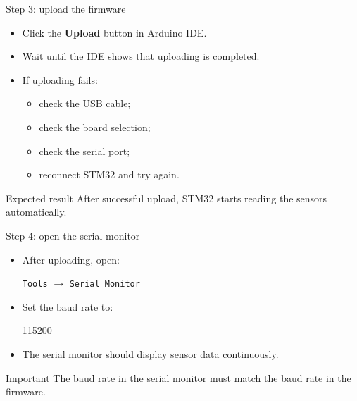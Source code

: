 \documentclass[aspectratio=169]{beamer}
\begin{document}
\begin{frame}{Step 3: upload the firmware}

\begin{itemize}
    \item Click the \textbf{Upload} button in Arduino IDE.
    \vspace{0.35cm}

    \item Wait until the IDE shows that uploading is completed.
    \vspace{0.35cm}

    \item If uploading fails:
    \vspace{0.15cm}
    \begin{itemize}
        \item check the USB cable;
        \item check the board selection;
        \item check the serial port;
        \item reconnect STM32 and try again.
    \end{itemize}
\end{itemize}

\vspace{0.25cm}

\begin{block}{Expected result}
\small
After successful upload, STM32 starts reading the sensors automatically.
\end{block}

\end{frame}

\begin{frame}{Step 4: open the serial monitor}

\begin{itemize}
    \item After uploading, open:
    \vspace{0.15cm}
    \begin{center}
    \texttt{Tools} $\rightarrow$ \texttt{Serial Monitor}
    \end{center}
    \vspace{0.25cm}

    \item Set the baud rate to:
    \vspace{0.15cm}
    \begin{center}
    \Large
    \textcolor{PKUDarkPurple}{115200}
    \end{center}
    \vspace{0.25cm}

    \item The serial monitor should display sensor data continuously.
\end{itemize}

\vspace{0.2cm}

\begin{alertblock}{Important}
\small
The baud rate in the serial monitor must match the baud rate in the firmware.
\end{alertblock}

\end{frame}
\end{document}
